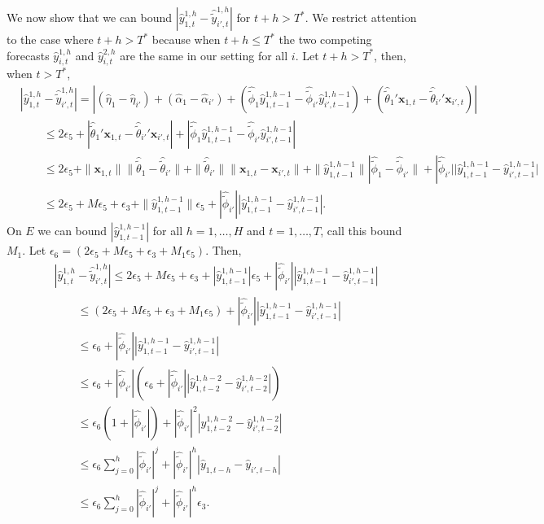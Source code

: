\documentclass[11pt]{article}
\newcommand{\x}{\textbf{x}}
\theoremstyle{definition}
\begin{document}
We now show that we can bound $|\hat{y}_{1,t}^{1,h} - \hat{\tilde{y}}_{i',t}^{1,h}|$ for $t+h > T^*$. We restrict attention to the case where $t+h > T^*$ because when $t+h \leq T^*$ the two competing forecasts $\hat{y}_{i,t}^{1,h}$ and $\hat{y}_{i,t}^{2,h}$ are the same in our setting for all $i$. Let $t+h > T^*$, then, when $t > T^*$,
\begin{align*}
  &|\hat{y}_{1,t}^{1,h} - \hat{\tilde{y}}_{i',t}^{1,h}| = |(\hat\eta_1 - \hat{\eta}_{i'}) + (\hat\alpha_1 - \hat\alpha_{i'}) + (\hat{\tilde{\phi}}_1 \hat{y}_{1,t-1}^{1,h-1} -  \hat{\tilde{\phi}}_{i'} \hat{y}_{i',t-1}^{1,h-1}) + (\hat{\tilde{\theta}}_1' \x_{1,t} - \hat{\tilde{\theta}}_{i'}' \x_{i',t})| \\
  &\qquad \leq 2\epsilon_5 + |\hat{\tilde{\theta}}_1' \x_{1,t} - \hat{\tilde{\theta}}_{i'}' \x_{i',t}| + |\hat{\tilde{\phi}}_1 \hat{y}_{1,t-1}^{1,h-1} -  \hat{\tilde{\phi}}_{i'} \hat{y}_{i',t-1}^{1,h-1}| \\
  &\qquad \leq 2\epsilon_5 + \|\x_{1,t}\|\|\hat{\tilde{\theta}}_1 - \hat{\tilde{\theta}}_{i'}\| + \|\hat{\tilde{\theta}}_{i'}\| \|\x_{1,t} - \x_{i',t}\| + \|\hat{y}_{1,t-1}^{1,h-1}\| |\hat{\tilde{\phi}}_1 - \hat{\tilde{\phi}}_{i'}\| + |\hat{\tilde{\phi}}_{i'}| |\hat{y}_{1,t-1}^{1,h-1} - \hat{y}_{i',t-1}^{1,h-1} | \\
  &\qquad \leq 2\epsilon_5 + M\epsilon_5 + \epsilon_3 + \|\hat{y}_{1,t-1}^{1,h-1}\|\epsilon_5 + |\hat{\tilde{\phi}}_{i'}| |\hat{y}_{1,t-1}^{1,h-1} - \hat{y}_{i',t-1}^{1,h-1} |.
\end{align*}
On $E$ we can bound $|\hat{y}_{1,t-1}^{1,h-1}|$ for all $h=1,\ldots,H$ and $t=1,\ldots,T$, call this bound $M_1$. Let $\epsilon_6 = (2\epsilon_5 + M\epsilon_5 + \epsilon_3 + M_1\epsilon_5)$. Then,
\begin{align*}
  &|\hat{y}_{1,t}^{1,h} - \hat{\tilde{y}}_{i',t}^{1,h}| \leq 2\epsilon_5 + M\epsilon_5 + \epsilon_3 + |\hat{y}_{1,t-1}^{1,h-1}|\epsilon_5 + |\hat{\tilde{\phi}}_{i'}| |\hat{y}_{1,t-1}^{1,h-1} - \hat{y}_{i',t-1}^{1,h-1}| \\
  &\qquad \leq (2\epsilon_5 + M\epsilon_5 + \epsilon_3 + M_1\epsilon_5) + |\hat{\tilde{\phi}}_{i'}| |\hat{y}_{1,t-1}^{1,h-1} - \hat{y}_{i',t-1}^{1,h-1}| \\
  &\qquad \leq \epsilon_6 + |\hat{\tilde{\phi}}_{i'}| |\hat{y}_{1,t-1}^{1,h-1} - \hat{y}_{i',t-1}^{1,h-1}| \\
  &\qquad \leq \epsilon_6 + |\hat{\tilde{\phi}}_{i'}|\left(\epsilon_6 + |\hat{\tilde{\phi}}_{i'}| |\hat{y}_{1,t-2}^{1,h-2} - \hat{y}_{i',t-2}^{1,h-2}|\right) \\
  &\qquad \leq \epsilon_6(1 + |\hat{\tilde{\phi}}_{i'}|) + |\hat{\tilde{\phi}}_{i'}|^2|\hat{y}_{1,t-2}^{1,h-2} - \hat{y}_{i',t-2}^{1,h-2}| \\  
  &\qquad \leq \epsilon_6 \sum_{j=0}^h |\hat{\tilde{\phi}}_{i'}|^j + |\hat{\tilde{\phi}}_{i'}|^h|\hat{y}_{1,t-h} - \hat{y}_{i',t-h}| \\
  &\qquad \leq \epsilon_6 \sum_{j=0}^h |\hat{\tilde{\phi}}_{i'}|^j + |\hat{\tilde{\phi}}_{i'}|^h\epsilon_3.  
\end{align*}
\end{document}
